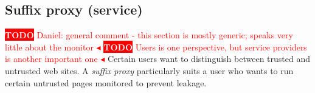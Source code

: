 \documentclass{llncs}
\newcommand{\todo}[1]{\colorbox{red}{\textcolor{white}{\sffamily\bfseries\scriptsize TODO}} \textcolor{red}{#1} \textcolor{red}{$\blacktriangleleft$}}
\begin{document}
\subsection{Suffix proxy (service)}
\label{sec:arch-suffix}
\todo{Daniel: general comment - this section is mostly generic; speaks very little about the monitor}
\todo{Users is one perspective, but  service providers is another
  important one}
Certain users want to distinguish between trusted and untrusted web sites.
A \emph{suffix proxy} particularly suits a user who wants to run certain untrusted 
pages monitored to prevent leakage.
\end{document}
